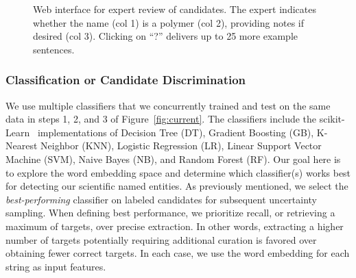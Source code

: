 \begin{figure}
\centering
{}
\caption{\label{fig:polyner} Web interface for expert review of candidates.
The expert indicates whether the name (col 1) is a polymer (col 2), 
providing notes if desired (col 3). 
Clicking on ``?'' delivers up to 25 more example sentences.
}
\end{figure}

\subsubsection{Classification or Candidate Discrimination}
We use multiple classifiers that we concurrently trained and test on the same data in steps 1, 2, and 3 of Figure~\ref{fig:current}.
The classifiers include the scikit-Learn~\cite{scikit-learn} implementations of Decision Tree (DT), Gradient Boosting (GB), K-Nearest Neighbor (KNN), Logistic Regression (LR), Linear Support Vector Machine (SVM), Naive Bayes (NB), and Random Forest (RF). 
Our goal here is to explore the word embedding space and determine which classifier(s) works best for detecting our scientific named entities.
As previously mentioned, we select%
the \textit{best-performing} classifier on labeled candidates for subsequent uncertainty sampling.
When defining best performance, we prioritize recall, or retrieving a maximum of targets, over precise extraction.
In other words, extracting a higher number of targets potentially requiring additional curation is favored over obtaining fewer correct targets.
In each case, we use the word embedding for each string as input features.




